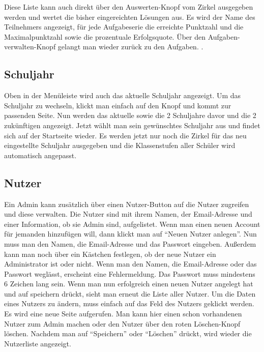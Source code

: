 Diese Liste kann auch direkt über den Auswerten-Knopf vom Zirkel ausgegeben werden und wertet die bisher eingereichten Lösungen aus. Es wird der Name des Teilnehmers angezeigt, für jede Aufgabeserie die erreichte Punktzahl und die Maximalpunktzahl sowie die prozentuale Erfolgsquote. Über den Aufgaben-verwalten-Knopf gelangt man wieder zurück zu den Aufgaben. .

\subsection{Schuljahr}
Oben in der Menüleiste wird auch das aktuelle Schuljahr angezeigt. Um das Schuljahr zu wechseln, klickt man einfach auf den Knopf und kommt zur passenden Seite. Nun werden das aktuelle sowie die 2 Schuljahre davor und die 2 zukünftigen angezeigt. Jetzt wählt man sein gewünschtes Schuljahr aus und findet sich auf der Startseite wieder. Es werden jetzt nur noch die Zirkel für das neu eingestellte Schuljahr ausgegeben und die Klassenstufen aller Schüler wird automatisch angepasst.

\subsection{Nutzer}
Ein Admin kann zusätzlich über einen Nutzer-Button auf die Nutzer zugreifen und diese verwalten. Die Nutzer sind mit ihrem Namen, der Email-Adresse und einer Information, ob sie Admin sind, aufgelistet. Wenn man einen neuen Account für jemanden hinzufügen will, dann klickt man auf "`Neuen Nutzer anlegen"'. Nun muss man den Namen, die Email-Adresse und das Passwort eingeben. Außerdem kann man noch über ein Kästchen festlegen, ob der neue Nutzer ein Administrator ist oder nicht. Wenn man den Namen, die Email-Adresse oder das Passwort weglässt, erscheint eine Fehlermeldung. Das Passwort muss mindestens 6 Zeichen lang sein. Wenn man nun erfolgreich einen neuen Nutzer angelegt hat und auf speichern drückt, sieht man erneut die Liste aller Nutzer. Um die Daten eines Nutzers zu ändern, muss einfach auf das Feld des Nutzers geklickt werden. Es wird eine neue Seite aufgerufen. Man kann hier einen schon vorhandenen Nutzer zum Admin machen oder den Nutzer über den roten Löschen-Knopf löschen. Nachdem man auf "`Speichern"' oder "`Löschen"' drückt, wird wieder die Nutzerliste angezeigt. 